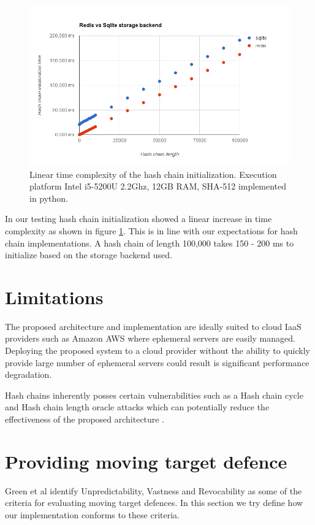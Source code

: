 \documentclass{sig-alternate-05-2015}
\begin{document}
\begin{figure}[h]
\includegraphics[scale=0.365]{performance}
\caption{Linear time complexity of the hash chain initialization. Execution platform Intel i5-5200U 2.2Ghz, 12GB RAM, SHA-512 implemented in python.}
\label{fig:performance}
\end{figure}

In our testing hash chain initialization showed a linear increase in time complexity as shown in figure \ref{fig:performance}. This is in line with our expectations for hash chain implementations. A hash chain of length 100,000 takes 150 - 200 ms to initialize based on the storage backend used. 

\section*{Limitations}
The proposed architecture and implementation are ideally suited to cloud IaaS providers such as Amazon AWS where ephemeral servers are easily managed. Deploying the proposed system to a cloud provider without the ability to quickly provide large number of ephemeral servers  could result is significant performance degradation. 

Hash chains inherently posses certain vulnerabilities such as a Hash chain cycle and Hash chain length oracle attacks which can potentially reduce the effectiveness of the proposed architecture \cite{lee_hash_2007}.

\section*{Providing moving target defence}

Green et al \cite{green_characterizing_2015} identify Unpredictability, Vastness and Revocability as some of the criteria for evaluating moving target defences. In this section we try define how our implementation conforms to these criteria.
\end{document}
